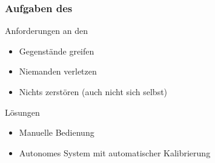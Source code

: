 \placelogofalse
\begin{frame}

  \frametitle{Aufgaben des \cob}

  \begin{block}{Anforderungen an den \cob}
    \pause
    \begin{itemize}
      \item Gegenstände greifen \pause
      \item Niemanden verletzen\pause
      \item Nichts zerstören \pause (auch nicht sich selbst)
    \end{itemize}
  \end{block}
  \pause

  \begin{block}{Lösungen}
    \pause
    \begin{itemize}
      \item Manuelle Bedienung \pause
      \item Autonomes System \pause mit automatischer Kalibrierung
    \end{itemize}
  \end{block}
\end{frame}

\placelogotrue

